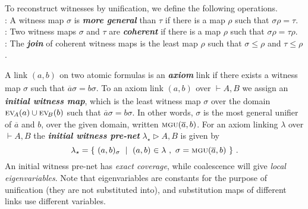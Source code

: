 \documentclass[UKenglish]{lipics-v2019}
\newcommand\defn[1]{\textit{\textbf{#1}}}
\newcommand\ex[2][{}]{\textsc{ev}_{#1}(#2)}
\newcommand\+{+}
\renewcommand\*{\times}
\newcommand\dual[1]{\overline{#1}}
\newcommand\seq[2]{{\vdash}#1,#2}
\newcommand\net[3]{#1\triangleright #2,#3}
\newcommand\mgu{\textsc{mgu}}
\newcommand\gen{\leq}
\newcommand\coh{\smallfrown}
\newcommand\join{\vee}
\newcommand\init[2]{\mgu(#1,#2)}
\newcommand\link[3][\sigma]{(#2,#3)_{#1}}
\begin{document}
\noindent
To reconstruct witnesses by unification, we define the following operations.
\\
\makebox[28pt][l]{$\sigma\gen\tau$}:\quad
	A witness map $\sigma$ is \defn{more general} than $\tau$ if there is a map $\rho$ such that $\sigma\rho=\tau$.
\\
\makebox[28pt][l]{$\sigma\coh\tau$}:\quad
	Two witness maps $\sigma$ and $\tau$ are \defn{coherent} if there is a map $\rho$ such that $\sigma\rho=\tau\rho$.
\\
\makebox[28pt][l]{$\sigma\join\tau$}:\quad
	The \defn{join} of coherent witness maps is the least map $\rho$ such that $\sigma\gen\rho$ and $\tau\gen\rho$.




%
A link $\link[]ab$ on two atomic formulas is an \defn{axiom} link if there exists a witness map $\sigma$ such that $\dual a\sigma=b\sigma$. To an axiom link $\link[]ab$ over $\seq AB$ we assign an \defn{initial witness map}, which is the least witness map $\sigma$ over the domain $\ex[\!A]a\cup\ex[\!B]b$ such that $\dual a\sigma=b\sigma$. In other words, $\sigma$ is the most general unifier of $\dual a$ and $b$, over the given domain, written $\init{\dual a}b$. For an axiom linking $\lambda$ over $\seq AB$ the \defn{initial witness pre-net} $\net{\lambda_\star}AB$ is given by
\[
	\lambda_\star = \{~\link ab~\mid~\link[]ab\in\lambda~,~\sigma=\init{\dual a}b~\}~.
\]
An initial witness pre-net has \emph{exact coverage}, while coalescence will give \emph{local eigenvariables}. Note that eigenvariables are constants for the purpose of unification (they are not substituted into), and substitution maps of different links use different variables.
\end{document}
